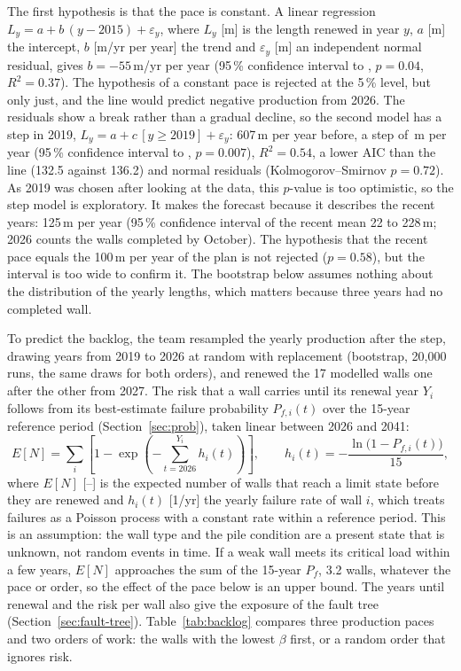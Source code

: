 The first hypothesis is that the pace is constant. A linear regression
$L_y = a + b\,(y - 2015) + \varepsilon_y$, where $L_y$ [m] is the length
renewed in year $y$, $a$ [m] the intercept, $b$ [m/yr per year] the trend and
$\varepsilon_y$ [m] an independent normal residual, gives $b = -55$\,m/yr per
year (95\,\% confidence interval  to , $p = 0.04$,
$R^2 = 0.37$). The hypothesis of a constant pace is rejected at the 5\,\%
level, but only just, and the line would predict negative production from
2026. The residuals show a break rather than a gradual decline, so the second
model has a step in 2019, $L_y = a + c\,[y \ge 2019] + \varepsilon_y$: 607\,m
per year before, a step of \,m per year (95\,\% confidence
interval  to , $p = 0.007$), $R^2 = 0.54$, a lower
AIC than the line (132.5 against 136.2) and normal residuals (Kolmogorov--Smirnov
$p = 0.72$). As 2019 was chosen after looking at the data, this $p$-value is
too optimistic, so the step model is exploratory. It makes the forecast
because it describes the recent years: 125\,m per year (95\,\% confidence
interval of the recent mean 22 to 228\,m; 2026 counts the walls completed by
October). The hypothesis that the recent pace equals the 100\,m per year of
the plan is not rejected ($p = 0.58$), but the interval is too wide to confirm
it. The bootstrap below assumes nothing about the
distribution of the yearly lengths, which matters because three years had no completed wall.

To predict the backlog, the team resampled the yearly production after the
step, drawing years from 2019 to 2026 at random with replacement (bootstrap, 20{,}000 runs, the same draws for both orders), and renewed the 17 modelled walls one after
the other from 2027. The risk that a wall carries until its renewal year $Y_i$
follows from its best-estimate failure probability $P_{f,i}(t)$ over the
15-year reference period (Section~\ref{sec:prob}), taken linear between 2026
and 2041:
\begin{equation}
E[N] = \sum_{i} \left[1 - \exp\!\left(-\sum_{t=2026}^{Y_i} h_i(t)\right)\right],
\qquad h_i(t) = -\frac{\ln\bigl(1 - P_{f,i}(t)\bigr)}{15}, \label{eq:exposure}
\end{equation}
where $E[N]$ [--] is the expected number of walls that reach a limit state
before they are renewed and $h_i(t)$ [1/yr] the yearly failure rate of wall $i$,
which treats failures as a Poisson process with a constant rate within a
reference period. This is an assumption: the wall type and the pile condition are a
present state that is unknown, not random events in time. If a weak wall meets
its critical load within a few years, $E[N]$ approaches the sum of the 15-year
$P_f$, 3.2 walls, whatever the pace or order, so the effect of the pace below is
an upper bound. The years until renewal and the risk per wall also give the exposure of
the fault tree (Section~\ref{sec:fault-tree}). Table~\ref{tab:backlog} compares
three production paces and two orders of work: the walls with the lowest
$\beta$ first, or a random order that ignores risk.

